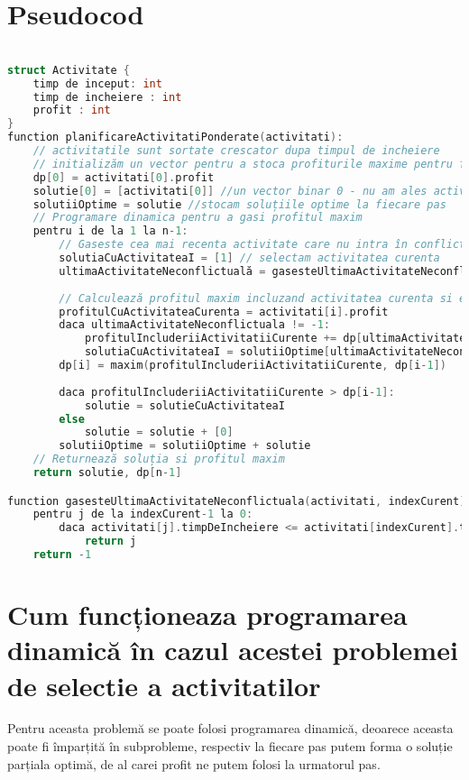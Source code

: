 \section{Pseudocod}
\begin{lstlisting}[language=C++]

struct Activitate {
    timp de inceput: int
    timp de incheiere : int
    profit : int 
}
function planificareActivitatiPonderate(activitati):
    // activitatile sunt sortate crescator dupa timpul de incheiere
    // initializăm un vector pentru a stoca profiturile maxime pentru fiecare activitate, fie dp un vector de dimensiune n, unde n este numărul de activitati
    dp[0] = activitati[0].profit
    solutie[0] = [activitati[0]] //un vector binar 0 - nu am ales activitatea si 1 - am ales activitatea
    solutiiOptime = solutie //stocam soluțiile optime la fiecare pas
    // Programare dinamica pentru a gasi profitul maxim
    pentru i de la 1 la n-1:
        // Gaseste cea mai recenta activitate care nu intra în conflict cu activitatea curenta
        solutiaCuActivitateaI = [1] // selectam activitatea curenta
        ultimaActivitateNeconflictuală = gasesteUltimaActivitateNeconflictuala(activitati, i)
        
        // Calculează profitul maxim incluzand activitatea curenta si excluzand-o
        profitulCuActivitateaCurenta = activitati[i].profit
        daca ultimaActivitateNeconflictuala != -1:
            profitulIncluderiiActivitatiiCurente += dp[ultimaActivitateNeconflictuala]
            solutiaCuActivitateaI = solutiiOptime[ultimaActivitateNeconflictuala] + solutiaCuActivitateaI
        dp[i] = maxim(profitulIncluderiiActivitatiiCurente, dp[i-1])
        
        daca profitulIncluderiiActivitatiiCurente > dp[i-1]:
            solutie = solutieCuActivitateaI
        else
            solutie = solutie + [0]
        solutiiOptime = solutiiOptime + solutie 
    // Returnează soluția si profitul maxim
    return solutie, dp[n-1]

function gasesteUltimaActivitateNeconflictuala(activitati, indexCurent):
    pentru j de la indexCurent-1 la 0:
        daca activitati[j].timpDeIncheiere <= activitati[indexCurent].timpDeInceput:
            return j
    return -1
\end{lstlisting}

\section{Cum funcționeaza programarea dinamică în cazul acestei problemei de selectie a activitatilor}
Pentru aceasta problemă se poate folosi programarea dinamică, deoarece aceasta poate fi împarțită în subprobleme, respectiv la fiecare pas putem forma o soluție parțiala optimă, de al carei profit ne putem folosi la urmatorul pas. \\
